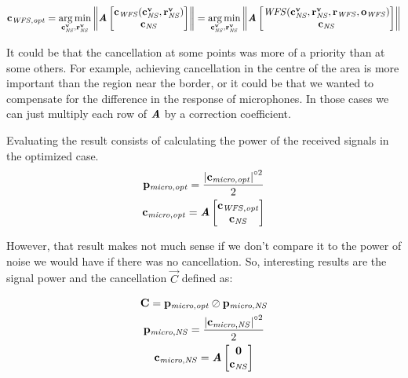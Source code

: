 \begin{equation}
\mathbf{c_{\mathit{WFS}, \mathit{opt}}} =
\operatorname*{arg\,min}_{\mathbf{c_\mathit{NS}^v}, \mathbf{r_{\mathit{NS}}^v}}
\left\| \bm{\mathit{A}}
	\begin{bmatrix}
	\mathbf{c_\mathit{WFS}}(\mathbf{c_\mathit{NS}^v}, \mathbf{r_{\mathit{NS}}^v})\\
	\mathbf{c_\mathit{NS}}\\
	\end{bmatrix}
 \right\| =
\operatorname*{arg\,min}_{\mathbf{c_\mathit{NS}^v}, \mathbf{r_{\mathit{NS}}^v}}
\left\| \bm{\mathit{A}}
	\begin{bmatrix}
	\mathit{WFS}(\mathbf{c_\mathit{NS}^v}, \mathbf{r_{\mathit{NS}}^v}, \mathbf{r}_\mathit{WFS}, \mathbf{o}_\mathit{WFS})\\
	\mathbf{c_\mathit{NS}}\\
	\end{bmatrix}
 \right\|
\end{equation}

It could be that the cancellation at some points was more of a priority than at some others. For example, achieving cancellation in the centre of the area is more important than the region near the border, or it could be that we wanted to compensate for the difference in the response of microphones. In those cases we can just multiply each row of $\bm{\mathit{A}}$ by a correction coefficient.

Evaluating the result consists of calculating the power of the received signals in the optimized case.
\begin{gather}
	\mathbf{p_\mathit{micro,opt}} = \frac{\left| \mathbf{c_{\mathit{micro,opt}}} \right|^{\circ 2}}{2}
	\\
	\mathbf{c_\mathit{\mathit{micro,opt}}} = \bm{\mathit{A}}
	\begin{bmatrix}
	\mathbf{c_\mathit{WFS,opt}} \\
	\mathbf{c_{\mathit{NS}}}
	\end{bmatrix}
\end{gather}

However, that result makes not much sense if we don't compare it to the power of noise we would have if there was no cancellation. So, interesting results are the signal power and the cancellation $\vec{C}$ defined as:

\begin{gather}
\mathbf{C} = \mathbf{p_\mathit{micro,opt}} \oslash \mathbf{p_\mathit{micro,NS}} \\
\mathbf{p_\mathit{micro,NS}} = \frac{\left| \mathbf{c_{\mathit{micro,NS}}} \right|^{\circ 2}}{2}\\
\mathbf{c_{\mathit{micro,NS}}} = \bm{\mathit{A}} 
\begin{bmatrix}
	\mathbf{0} \\
	\mathbf{c_{\mathit{NS}}}
\end{bmatrix}
\end{gather}


